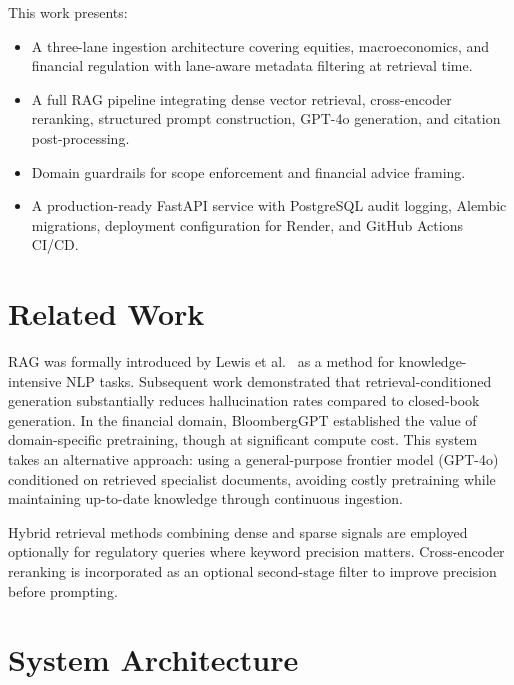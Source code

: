 \documentclass[10pt,a4paper,twocolumn]{article}
\begin{document}
This work presents:
\begin{itemize}
  \item A three-lane ingestion architecture covering equities, macroeconomics, and financial
        regulation with lane-aware metadata filtering at retrieval time.
  \item A full RAG pipeline integrating dense vector retrieval, cross-encoder reranking,
        structured prompt construction, GPT-4o generation, and citation post-processing.
  \item Domain guardrails for scope enforcement and financial advice framing.
  \item A production-ready FastAPI service with PostgreSQL audit logging, Alembic
        migrations, deployment configuration for Render, and GitHub Actions CI/CD.
\end{itemize}

\section{Related Work}

RAG was formally introduced by Lewis et al.\ \cite{lewis2020rag} as a method for
knowledge-intensive NLP tasks. Subsequent work \cite{guu2020realm, izacard2021leveraging}
demonstrated that retrieval-conditioned generation substantially reduces hallucination rates
compared to closed-book generation. In the financial domain, BloombergGPT \cite{wu2023bloomberggpt}
established the value of domain-specific pretraining, though at significant compute cost.
This system takes an alternative approach: using a general-purpose frontier model (GPT-4o)
conditioned on retrieved specialist documents, avoiding costly pretraining while maintaining
up-to-date knowledge through continuous ingestion.

Hybrid retrieval methods combining dense and sparse signals \cite{formal2021splade} are
employed optionally for regulatory queries where keyword precision matters. Cross-encoder
reranking \cite{nogueira2019passage} is incorporated as an optional second-stage filter to
improve precision before prompting.

\section{System Architecture}
\end{document}

